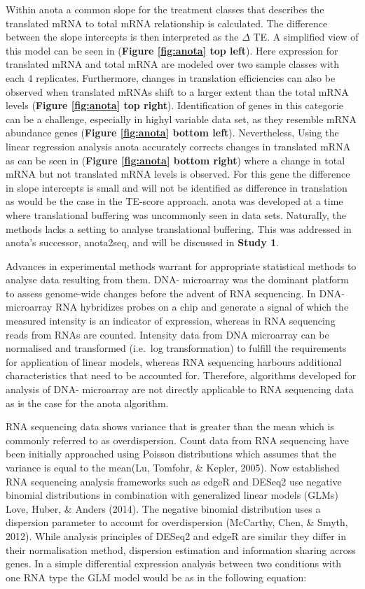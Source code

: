\documentclass[
  12pt,
  openany]{book}
\begin{document}
Within anota a common slope for the treatment classes that describes the translated mRNA to total mRNA relationship is calculated. The difference between the slope intercepts is then interpreted as the \(\varDelta\) TE. A simplified view of this model can be seen in (\textbf{Figure \ref{fig:anota} top left}). Here expression for translated mRNA and total mRNA are modeled over two sample classes with each 4 replicates. Furthermore, changes in translation efficiencies can also be observed when translated mRNAs shift to a larger extent than the total mRNA levels (\textbf{Figure \ref{fig:anota} top right}). Identification of genes in this categorie can be a challenge, especially in highyl variable data set, as they resemble mRNA abundance genes (\textbf{Figure \ref{fig:anota} bottom left}). Nevertheless, Using the linear regression analysis anota accurately corrects changes in translated mRNA as can be seen in (\textbf{Figure \ref{fig:anota} bottom right}) where a change in total mRNA but not translated mRNA levels is observed. For this gene the difference in slope intercepts is small and will not be identified as difference in translation as would be the case in the TE-score approach. anota was developed at a time where translational buffering was uncommonly seen in data sets. Naturally, the methods lacks a setting to analyse translational buffering. This was addressed in anota's successor, anota2seq, and will be discussed in \textbf{Study 1}.

Advances in experimental methods warrant for appropriate statistical methods to analyse data resulting from them. DNA- microarray was the dominant platform to assess genome-wide changes before the advent of RNA sequencing. In DNA- microarray RNA hybridizes probes on a chip and generate a signal of which the measured intensity is an indicator of expression, whereas in RNA sequencing reads from RNAs are counted. Intensity data from DNA microarray can be normalised and transformed (i.e.~log transformation) to fulfill the requirements for application of linear models, whereas RNA sequencing harbours additional characteristics that need to be accounted for. Therefore, algorithms developed for analysis of DNA- microarray are not directly applicable to RNA sequencing data as is the case for the anota algorithm.

RNA sequencing data shows variance that is greater than the mean which is commonly referred to as overdispersion. Count data from RNA sequencing have been initially approached using Poisson distributions which assumes that the variance is equal to the mean(Lu, Tomfohr, \& Kepler, 2005). Now established RNA sequencing analysis frameworks such as edgeR and DESeq2 use negative binomial distributions in combination with generalized linear models (GLMs) Love, Huber, \& Anders (2014). The negative binomial distribution uses a dispersion parameter to account for overdispersion (McCarthy, Chen, \& Smyth, 2012). While analysis principles of DESeq2 and edgeR are similar they differ in their normalisation method, dispersion estimation and information sharing across genes. In a simple differential expression analysis between two conditions with one RNA type the GLM model would be as in the following equation:
\end{document}
